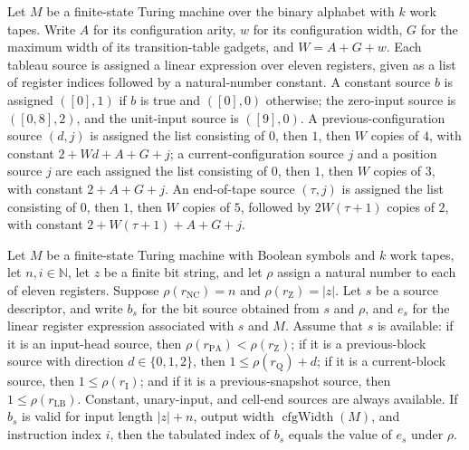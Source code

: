 \begin{definition}
\label{Complexity.UTab.SSrc.toLinE}
\leanok
{}
Let $M$ be a finite-state Turing machine over the binary alphabet with $k$ work tapes.
Write $A$ for its configuration arity, $w$ for its configuration width, $G$ for the
maximum width of its transition-table gadgets, and $W=A+G+w$. Each tableau source is
assigned a linear expression over eleven registers, given as a list of register indices
followed by a natural-number constant. A constant source $b$ is assigned $([0],1)$ if
$b$ is true and $([0],0)$ otherwise; the zero-input source is $([0,8],2)$, and the
unit-input source is $([9],0)$. A previous-configuration source $(d,j)$ is assigned the
list consisting of $0$, then $1$, then $W$ copies of $4$, with constant $2+Wd+A+G+j$; a
current-configuration source $j$ and a position source $j$ are each assigned the list
consisting of $0$, then $1$, then $W$ copies of $3$, with constant $2+A+G+j$. An
end-of-tape source $(\tau,j)$ is assigned the list consisting of $0$, then $1$, then $W$
copies of $5$, followed by $2W(\tau+1)$ copies of $2$, with constant
$2+W(\tau+1)+A+G+j$.
\end{definition}

\begin{theorem}
\label{Complexity.UTab.tabSrc_toBitSrc}
\leanok
{}
Let $M$ be a finite-state Turing machine with Boolean symbols and $k$ work tapes, let
$n,i\in\mathbb{N}$, let $z$ be a finite bit string, and let $\rho$ assign a natural
number to each of eleven registers. Suppose $\rho(r_{\mathrm{NC}})=n$ and
$\rho(r_{\mathrm{Z}})=|z|$. Let $s$ be a source descriptor, and write $b_s$ for the bit
source obtained from $s$ and $\rho$, and $e_s$ for the linear register expression
associated with $s$ and $M$. Assume that $s$ is available: if it is an input-head
source, then $\rho(r_{\mathrm{PA}})<\rho(r_{\mathrm{Z}})$; if it is a previous-block
source with direction $d\in\{0,1,2\}$, then $1\leq\rho(r_{\mathrm{Q}})+d$; if it is a
current-block source, then $1\leq\rho(r_{\mathrm{I}})$; and if it is a previous-snapshot
source, then $1\leq\rho(r_{\mathrm{LB}})$. Constant, unary-input, and cell-end sources
are always available. If $b_s$ is valid for input length $|z|+n$, output width
$\operatorname{cfgWidth}(M)$, and instruction index $i$, then the tabulated index of
$b_s$ equals the value of $e_s$ under $\rho$.
\end{theorem}

